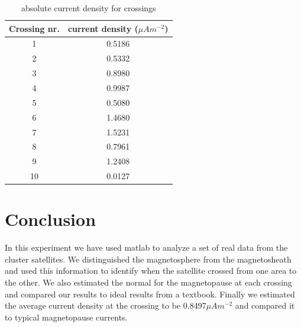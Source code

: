  \begin{table}[H]
\centering
\caption{absolute current density for crossings}
\begin{tabular}{ |c||c| }
    \hline
    Crossing nr. & current density ($\mu Am^{-2}$)\\ \hline \hline
  1 &  0.5186  \\ \hline
  2 &  0.5332 \\ \hline
  3 &  0.8980  \\ \hline
  4 &  0.9987  \\ \hline
  5 &  0.5080 \\ \hline
  6 &  1.4680  \\ \hline
  7 &  1.5231  \\ \hline
  8 &  0.7961  \\ \hline
  9 &  1.2408  \\ \hline
  10 & 0.0127 \\ \hline
   
    \end{tabular}
\label{table:currents}

\section*{Conclusion}
In this experiment we have used matlab to analyze a set of real data from the cluster satellites. We distinguished the magnetosphere from the magnetosheath and used this information to identify when the satellite crossed from one area to the other. We also estimated the normal for the magnetopause at each crossing and compared our results to ideal results from a textbook. Finally we estimated the average current density at the crossing to be 0.8497$\mu A m^{-2}$ and compared it to typical magnetopause currents.
\end{table}

